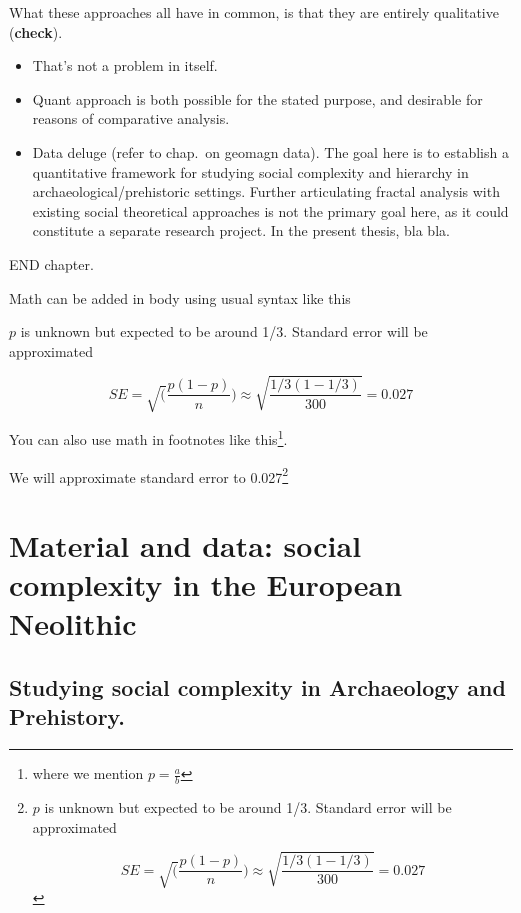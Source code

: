 \documentclass[
  12pt,
]{book}
\begin{document}
What these approaches all have in common, is that they are entirely qualitative (\textbf{check}).

\begin{itemize}
\item
  That's not a problem in itself.
\item
  Quant approach is both possible for the stated purpose, and desirable for reasons of comparative analysis.
\item
  Data deluge (refer to chap.~on geomagn data). The goal here is to establish a quantitative framework for studying social complexity and hierarchy in archaeological/prehistoric settings. Further articulating fractal analysis with existing social theoretical approaches is not the primary goal here, as it could constitute a separate research project. In the present thesis, bla bla.
\end{itemize}

END chapter.

Math can be added in body using usual syntax like this

\(p\) is unknown but expected to be around 1/3. Standard error will be approximated

\[
SE = \sqrt(\frac{p(1-p)}{n}) \approx \sqrt{\frac{1/3 (1 - 1/3)} {300}} = 0.027
\]

You can also use math in footnotes like this\footnote{where we mention \(p = \frac{a}{b}\)}.

We will approximate standard error to 0.027\footnote{\(p\) is unknown but expected to be around 1/3. Standard error will be approximated

  \[
  SE = \sqrt(\frac{p(1-p)}{n}) \approx \sqrt{\frac{1/3 (1 - 1/3)} {300}} = 0.027
  \]}

\hypertarget{material-and-data-social-complexity-in-the-european-neolithic}{%
\chapter{Material and data: social complexity in the European Neolithic}\label{material-and-data-social-complexity-in-the-european-neolithic}}

\hypertarget{studying-social-complexity-in-archaeology-and-prehistory.}{%
\section{Studying social complexity in Archaeology and Prehistory.}\label{studying-social-complexity-in-archaeology-and-prehistory.}}
\end{document}
